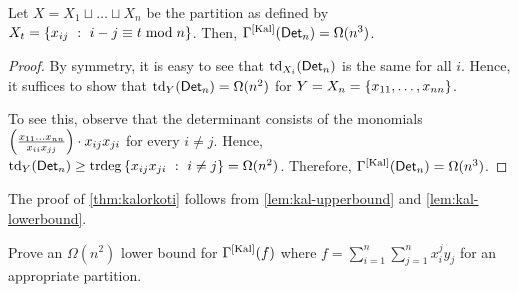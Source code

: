 \begin{lemma}\label{lem:kal-lowerbound}
  Let $X = X_1 \sqcup \dots \sqcup X_n$ be the partition as defined by
  $X_t = \left\{{x_{ij}}\ : \ {i-j\equiv t\bmod{n}}\right\}$. 
Then,
  $\Gamma^{\mathrm{[Kal]}}(\operatorname{\mathsf{Det}}_n) = \Omega(n^3)$.
\end{lemma}
\begin{proof}
  By symmetry, it is easy to see that $\text{td}_{X_i}(\operatorname{\mathsf{Det}}_n)$ is
  the same for all $i$. 
Hence, it suffices to show that
  $\text{td}_{Y}(\operatorname{\mathsf{Det}}_n) = \Omega(n^2)$ for $Y = X_n = \left\{x_{11},\dots, x_{nn}\right\}$. 

  To see this, observe that the determinant consists of the monomials
  $\left(\frac{x_{11}\dots x_{nn}}{x_{ii}x_{jj}}\right)\cdot
  x_{ij}x_{ji}$ for every $i\neq j$. 
Hence, $\text{td}_{Y}(\operatorname{\mathsf{Det}}_n)
  \geq \mathrm{trdeg}\left\{{x_{ij}x_{ji}}\ : \ {i\neq j}\right\} =
  \Omega(n^2)$. 
Therefore, $\Gamma^{\mathrm{[Kal]}}(\operatorname{\mathsf{Det}}_n) =
  \Omega(n^3)$.
\end{proof}

The proof of \autoref{thm:kalorkoti} follows from
\autoref{lem:kal-upperbound} and \autoref{lem:kal-lowerbound}.\\

\begin{exercise}
Prove an $\Omega(n^2)$ lower bound for $\Gamma^{\mathrm{[Kal]}}(f)$ where $f = \sum_{i=1}^n \sum_{j=1}^n x_i^j y_j$ for an appropriate partition. 
\end{exercise}



